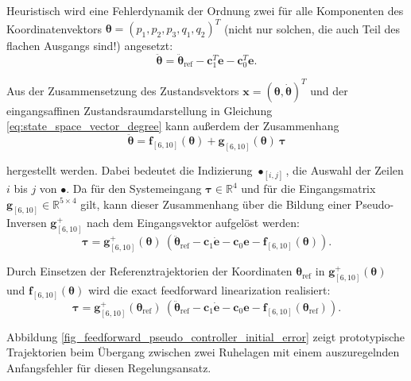 Heuristisch wird eine Fehlerdynamik der Ordnung zwei für alle Komponenten des Koordinatenvektors $\boldsymbol{\theta} = (p_1, p_2, p_3, q_1, q_2)^T$ (nicht nur solchen, die auch Teil des flachen Ausgangs sind!) angesetzt:
\begin{equation}
	\ddot{\boldsymbol{\theta}} = \ddot{\boldsymbol{\theta}}_{\text{ref}} - \mathbf{c}_1^T \dot{\mathbf{e}} - \mathbf{c}_0^T \mathbf{e}.
\end{equation}

Aus der Zusammensetzung des Zustandsvektors $\mathbf{x} = (\boldsymbol{\theta}, \dot{\boldsymbol{\theta}})^T$ und der eingangsaffinen Zustandsraumdarstellung in Gleichung \eqref{eq:state_space_vector_degree} kann außerdem der Zusammenhang
\begin{equation}
	\ddot{\boldsymbol{\theta}} = \mathbf{f}_{[6, 10]}(\boldsymbol{\theta}) + \mathbf{g}_{[6, 10]}(\boldsymbol{\theta}) \ \boldsymbol{\tau}
\end{equation}

hergestellt werden. Dabei bedeutet die Indizierung $\bullet_{[i, j]}$, die Auswahl der Zeilen $i$ bis $j$ von $\bullet$. Da für den Systemeingang $\boldsymbol{\tau} \in \mathbb{R}^4$ und für die Eingangsmatrix $\mathbf{g}_{[6, 10]} \in \mathbb{R}^{5 \times 4}$ gilt, kann dieser Zusammenhang über die Bildung einer Pseudo-Inversen $\mathbf{g}_{[6, 10]}^+$ nach dem Eingangsvektor aufgelöst werden:
\begin{equation}
	\boldsymbol{\tau}= \mathbf{g}^{+}_{[6, 10]} (\boldsymbol{\theta}) \ (\ddot{\boldsymbol{\theta}}_{\text{ref}} - \mathbf{c}_{1} \mathbf{\dot{e}} - \mathbf{c}_{0} \mathbf{e} - \mathbf{f}_{[6, 10]}(\boldsymbol{\theta})).
\end{equation}

Durch Einsetzen der Referenztrajektorien der Koordinaten $\boldsymbol{\theta}_{\text{ref}}$ in $\mathbf{g}_{[6, 10]}^+(\boldsymbol{\theta})$ und $\mathbf{f}_{[6, 10]}(\boldsymbol{\theta})$ wird die exact feedforward linearization realisiert:
\begin{equation}
\label{eq:control_law__ff_lin_pseudo}
\boldsymbol{\tau}= \mathbf{g}^{+}_{[6, 10]} (\boldsymbol{\theta}_{\text{ref}}) \ (\ddot{\boldsymbol{\theta}}_{\text{ref}} - \mathbf{c}_{1} \mathbf{\dot{e}} - \mathbf{c}_{0} \mathbf{e} - \mathbf{f}_{[6, 10]}(\boldsymbol{\theta}_{\text{ref}})).
\end{equation} 

Abbildung \ref{fig_feedforward_pseudo_controller_initial_error} zeigt prototypische Trajektorien beim Übergang zwischen zwei Ruhelagen mit einem auszuregelnden Anfangsfehler für diesen Regelungsansatz.

